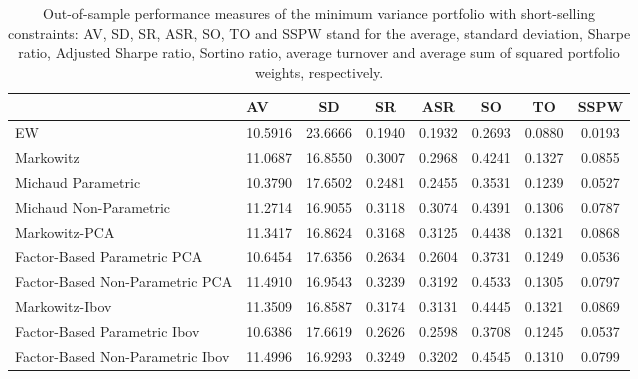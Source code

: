 \begin{table}

\caption{\label{tab:empirical_mvp}Out-of-sample performance measures of the minimum variance portfolio with short-selling constraints: AV, SD, SR, ASR, SO, TO and SSPW stand for the average, standard deviation, Sharpe ratio, Adjusted Sharpe ratio, Sortino ratio, average turnover and average sum of squared portfolio weights, respectively.}
\centering
\begin{tabular}[t]{l|l|c|c|c|c|c|c}
\hline
  & AV & SD & SR & ASR & SO & TO & SSPW\\
\hline
EW & 10.5916 & 23.6666 & 0.1940 & 0.1932 & 0.2693 & 0.0880 & 0.0193\\
\hline
Markowitz & 11.0687 & 16.8550 & 0.3007 & 0.2968 & 0.4241 & 0.1327 & 0.0855\\
\hline
Michaud Parametric & 10.3790 & 17.6502 & 0.2481 & 0.2455 & 0.3531 & 0.1239 & 0.0527\\
\hline
Michaud Non-Parametric & 11.2714 & 16.9055 & 0.3118 & 0.3074 & 0.4391 & 0.1306 & 0.0787\\
\hline
Markowitz-PCA & 11.3417 & 16.8624 & 0.3168 & 0.3125 & 0.4438 & 0.1321 & 0.0868\\
\hline
Factor-Based Parametric PCA & 10.6454 & 17.6356 & 0.2634 & 0.2604 & 0.3731 & 0.1249 & 0.0536\\
\hline
Factor-Based Non-Parametric PCA & 11.4910 & 16.9543 & 0.3239 & 0.3192 & 0.4533 & 0.1305 & 0.0797\\
\hline
Markowitz-Ibov & 11.3509 & 16.8587 & 0.3174 & 0.3131 & 0.4445 & 0.1321 & 0.0869\\
\hline
Factor-Based Parametric Ibov & 10.6386 & 17.6619 & 0.2626 & 0.2598 & 0.3708 & 0.1245 & 0.0537\\
\hline
Factor-Based Non-Parametric Ibov & 11.4996 & 16.9293 & 0.3249 & 0.3202 & 0.4545 & 0.1310 & 0.0799\\
\hline
\end{tabular}
\end{table}
